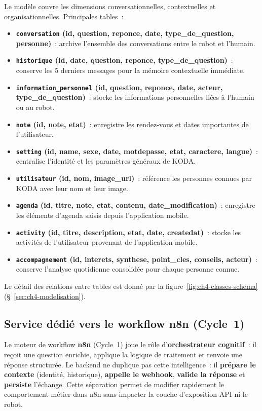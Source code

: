 \documentclass[a4paper,12pt]{report}
\begin{document}
	Le modèle couvre les dimensions conversationnelles, contextuelles et
	organisationnelles. Principales tables~:
	\begin{itemize}
	\item \textbf{\texttt{conversation} \;(id, question, reponce, date, type\_de\_question, personne)}~: archive l'ensemble des conversations entre le robot et l'humain.
	\item \textbf{\texttt{historique} \;(id, date, question, reponce, type\_de\_question)}~: conserve les 5 derniers messages pour la mémoire contextuelle immédiate.
	\item \textbf{\texttt{information\_personnel} \;(id, question, reponce, date, acteur, type\_de\_question)}~: stocke les informations personnelles liées à l'humain ou au robot.
	\item \textbf{\texttt{note} \;(id, note, etat)}~: enregistre les rendez-vous et dates importantes de l'utilisateur.
	\item \textbf{\texttt{setting} \;(id, name, sexe, date, motdepasse, etat, caractere, langue)}~: centralise l'identité et les paramètres généraux de KODA.
	\item \textbf{\texttt{utilisateur} \;(id, nom, image\_url)}~: référence les personnes connues par KODA avec leur nom et leur image.
	\item \textbf{\texttt{agenda} \;(id, titre, note, etat, contenu, date\_modification)}~: enregistre les éléments d'agenda saisis depuis l'application mobile.
	\item \textbf{\texttt{activity} \;(id, titre, description, etat, date, createdat)}~: stocke les activités de l'utilisateur provenant de l'application mobile.
	\item \textbf{\texttt{accompagnement} \;(id, interets, synthese, point\_cles, conseils, acteur)}~: conserve l'analyse quotidienne consolidée pour chaque personne connue.
\end{itemize}

\noindent Le détail des relations entre tables est donné par la
figure~\ref{fig:ch4-classes-schema} (§~\ref{sec:ch4-modelisation}).
	
	\subsection{Service dédié vers le workflow n8n (Cycle~1)}
	
	Le moteur de workflow \textbf{n8n} (Cycle~1) joue le rôle d'\textbf{orchestrateur
	cognitif}~: il reçoit une question enrichie, applique la logique de traitement et
	renvoie une réponse structurée. Le backend ne duplique pas cette intelligence~: il
	\textbf{prépare le contexte} (identité, historique), \textbf{appelle le webhook},
	\textbf{valide la réponse} et \textbf{persiste} l'échange. Cette séparation permet
	de modifier rapidement le comportement métier dans n8n sans impacter la couche
	d'exposition API ni le robot.
	
\end{document}
